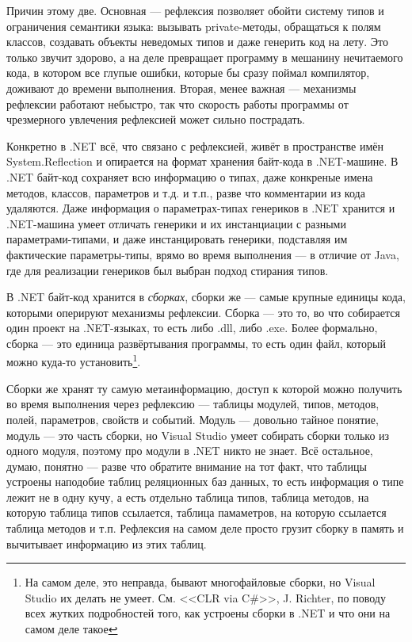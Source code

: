 \documentclass[a5paper]{article}
\begin{document}
Причин этому две. Основная --- рефлексия позволяет обойти систему типов и ограничения семантики языка: вызывать private-методы, обращаться к полям классов, создавать объекты неведомых типов и даже генерить код на лету. Это только звучит здорово, а на деле превращает программу в мешанину нечитаемого кода, в котором все глупые ошибки, которые бы сразу поймал компилятор, доживают до времени выполнения. Вторая, менее важная --- механизмы рефлексии работают небыстро, так что скорость работы программы от чрезмерного увлечения рефлексией может сильно пострадать.

Конкретно в .NET всё, что связано с рефлексией, живёт в пространстве имён System.Reflection и опирается на формат хранения байт-кода в .NET-машине. В .NET байт-код сохраняет всю информацию о типах, даже конкреные имена методов, классов, параметров и т.д. и т.п., разве что комментарии из кода удаляются. Даже информация о параметрах-типах генериков в .NET хранится и .NET-машина умеет отличать генерики и их инстанциации с разными параметрами-типами, и даже инстанцировать генерики, подставляя им фактические параметры-типы, врямо во время выполнения --- в отличие от Java, где для реализации генериков был выбран подход стирания типов.

В .NET байт-код хранится в \textit{сборках}, сборки же --- самые крупные единицы кода, которыми оперируют механизмы рефлексии. Сборка --- это то, во что собирается один проект на .NET-языках, то есть либо .dll, либо .exe. Более формально, сборка --- это единица развёртывания программы, то есть один файл, который можно куда-то установить\footnote{На самом деле, это неправда, бывают многофайловые сборки, но Visual Studio их делать не умеет. См. <<CLR via C\#>>, J. Richter, по поводу всех жутких подробностей того, как устроены сборки в .NET и что они на самом деле такое}.

Сборки же хранят ту самую метаинформацию, доступ к которой можно получить во время выполнения через рефлексию --- таблицы модулей, типов, методов, полей, параметров, свойств и событий. Модуль --- довольно тайное понятие, модуль --- это часть сборки, но Visual Studio умеет собирать сборки только из одного модуля, поэтому про модули в .NET никто не знает. Всё остальное, думаю, понятно --- разве что обратите внимание на тот факт, что таблицы устроены наподобие таблиц реляционных баз данных, то есть информация о типе лежит не в одну кучу, а есть отдельно таблица типов, таблица методов, на которую таблица типов ссылается, таблица памаметров, на которую ссылается таблица методов и т.п. Рефлексия на самом деле просто грузит сборку в память и вычитывает информацию из этих таблиц.
\end{document}
